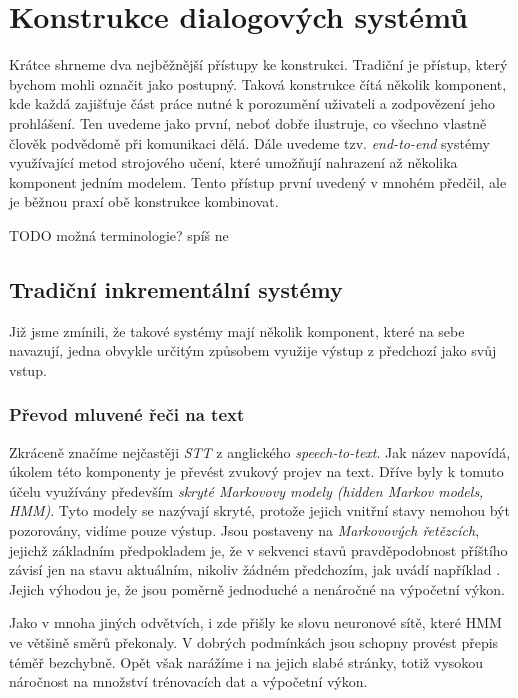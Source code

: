 
\chapter{Konstrukce dialogových systémů}

Krátce shrneme dva
nejběžnější přístupy ke konstrukci. Tradiční je přístup, který bychom
mohli označit jako postupný. Taková konstrukce čítá několik komponent, kde
každá zajišťuje část práce nutné k porozumění uživateli a zodpovězení jeho
prohlášení. Ten uvedeme jako první, neboť dobře ilustruje, co všechno vlastně
člověk podvědomě při komunikaci dělá. Dále uvedeme tzv. \textit{end-to-end}
systémy využívající metod strojového učení, které umožňují nahrazení až
několika komponent jedním modelem. Tento přístup první uvedený v mnohém
předčil, ale je běžnou praxí obě konstrukce kombinovat.

TODO možná terminologie? spíš ne

\section{Tradiční inkrementální systémy}

Již jsme zmínili, že takové systémy mají několik komponent, které na sebe
navazují, jedna obvykle určitým způsobem využije výstup z předchozí jako svůj
vstup.

\subsection{Převod mluvené řeči na text}

Zkráceně značíme nejčastěji \textit{STT} z anglického \textit{speech-to-text}.
Jak název napovídá, úkolem této komponenty je převést zvukový projev na text.
Dříve byly k tomuto účelu využívány především \textit{skryté
    Markovovy modely (hidden Markov models, HMM)}. Tyto modely se nazývají skryté,
protože jejich vnitřní stavy nemohou být pozorovány, vidíme pouze výstup.
Jsou postaveny na \textit{Markovových řetězcích}, jejichž základním předpokladem
je, že v sekvenci stavů pravděpodobnost příštího závisí jen na stavu aktuálním,
nikoliv žádném předchozím, jak uvádí například \citet[strana 4]{brooks_handbook_2011}.
Jejich výhodou je, že jsou poměrně jednoduché a nenáročné na výpočetní výkon.

Jako v mnoha jiných odvětvích, i zde přišly ke slovu neuronové sítě, které HMM
ve většině směrů překonaly. V dobrých podmínkách jsou schopny provést přepis
téměř bezchybně. Opět však narážíme i na jejich slabé stránky,
totiž vysokou náročnost na množství trénovacích dat a výpočetní výkon.

